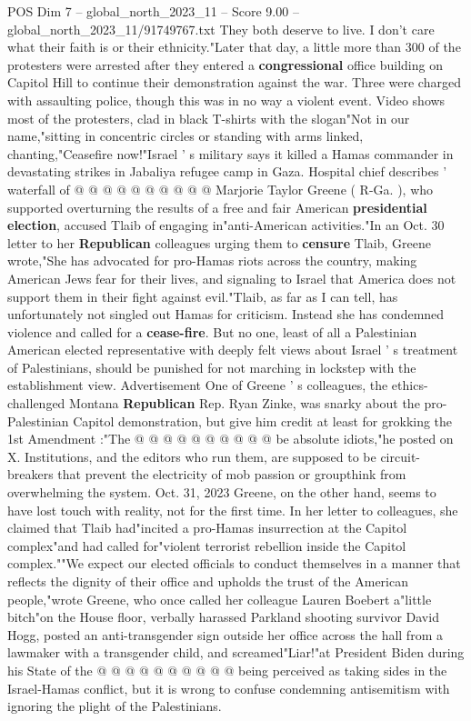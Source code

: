 \begin{textsample}{POS Dim 7 – global\_north\_2023\_11 – Score 9.00 – global\_north\_2023\_11/91749767.txt}
They both deserve to live.
I don't care what their faith is or their ethnicity."Later that day, a little more than 300 of the protesters were arrested after they entered a \textbf{congressional} office building on Capitol Hill to continue their demonstration against the war.
Three were charged with assaulting police, though this was in no way a violent event.
Video shows most of the protesters, clad in black T-shirts with the slogan"Not in our name,"sitting in concentric circles or standing with arms linked, chanting,"Ceasefire now!"Israel ' s military says it killed a Hamas commander in devastating strikes in Jabaliya refugee camp in Gaza.
Hospital chief describes ' waterfall of @ @ @ @ @ @ @ @ @ @ Marjorie Taylor Greene ( R-Ga. ), who supported overturning the results of a free and fair American \textbf{presidential} \textbf{election}, accused Tlaib of engaging in"anti-American activities."In an Oct. 30 letter to her \textbf{Republican} colleagues urging them to \textbf{censure} Tlaib, Greene wrote,"She has advocated for pro-Hamas riots across the country, making American Jews fear for their lives, and signaling to Israel that America does not support them in their fight against evil."Tlaib, as far as I can tell, has unfortunately not singled out Hamas for criticism.
Instead she has condemned violence and called for a \textbf{cease-fire}.
But no one, least of all a Palestinian American elected representative with deeply felt views about Israel ' s treatment of Palestinians, should be punished for not marching in lockstep with the establishment view.
Advertisement One of Greene ' s colleagues, the ethics-challenged Montana \textbf{Republican} Rep.
Ryan Zinke, was snarky about the pro-Palestinian Capitol demonstration, but give him credit at least for grokking the 1st Amendment :"The @ @ @ @ @ @ @ @ @ @ be absolute idiots,"he posted on X.
Institutions, and the editors who run them, are supposed to be circuit-breakers that prevent the electricity of mob passion or groupthink from overwhelming the system.
Oct. 31, 2023 Greene, on the other hand, seems to have lost touch with reality, not for the first time.
In her letter to colleagues, she claimed that Tlaib had"incited a pro-Hamas insurrection at the Capitol complex"and had called for"violent terrorist rebellion inside the Capitol complex.""We expect our elected officials to conduct themselves in a manner that reflects the dignity of their office and upholds the trust of the American people,"wrote Greene, who once called her colleague Lauren Boebert a"little bitch"on the House floor, verbally harassed Parkland shooting survivor David Hogg, posted an anti-transgender sign outside her office across the hall from a lawmaker with a transgender child, and screamed"Liar!"at President Biden during his State of the @ @ @ @ @ @ @ @ @ @ being perceived as taking sides in the Israel-Hamas conflict, but it is wrong to confuse condemning antisemitism with ignoring the plight of the Palestinians.

\end{textsample}
